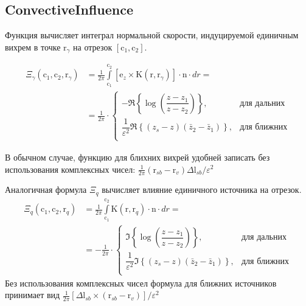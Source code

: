 \documentclass[a4paper,14pt]{extreport}
\newcommand{\br}[1]{\boldsymbol{\mathrm{#1}}}
\renewcommand{\vec}[1]{\br{#1}}
\begin{document}
\subsection{ConvectiveInfluence}
\label{ConvectiveInfluence}
Функция вычисляет интеграл нормальной скорости, индуцируемой единичным вихрем 
в точке $\vec r_\gamma$ на отрезок $[\vec c_1, \vec c_2]$.

\begin{equation}
\label{eq_VortexInfluence}
\begin{split}
\Xi_\gamma(\vec c_1, \vec c_2, \vec r_\gamma)
&= \frac{1}{2\pi} \int\limits_{\vec c_1}^{\vec c_2} [\vec e_z \times \vec K(\vec r,\vec r_\gamma)] \cdot \vec n \cdot dr
= \\ &= \frac{1}{2\pi} \cdot
\begin{cases}
-\Re \left\lbrace \log \left(\dfrac{z-z_1}{z-z_2}\right) \right\rbrace,	&\text{для дальних}\\
\dfrac{1}{\varepsilon^2}\Re \left\lbrace (z_s-z)(\bar z_2 - \bar z_1) \right\rbrace, 	&\text{для ближних}\\
\end{cases}
\end{split}
\end{equation}
\begin{center}\end{center}

В обычном случае, функцию для блихних вихрей удобней записать без использования
комплексных чисел:
$\frac{1}{2\pi} (\vec r_{sb} - \vec r_v) \Delta\vec l_{sb} / \varepsilon^2$

Аналогичная формула $\Xi_q$ вычисляет влияние единичного источника на отрезок.
\begin{equation}
\label{eq_SourceInfluence}
\begin{split}
\Xi_q (\vec c_1, \vec c_2, \vec r_q)
&= \frac{1}{2\pi} \int\limits_{\vec c_1}^{\vec c_2} \vec K(\vec r, \vec r_q) \cdot \vec n \cdot dr
= \\ & = -\frac{1}{2\pi} \cdot
\begin{cases}
\Im \left\lbrace \log \left(\dfrac{z-z_1}{z-z_2}\right) \right\rbrace,	&\text{для дальних}\\
\dfrac{1}{\varepsilon^2}\Im \left\lbrace (z_s-z)(\bar z_2 - \bar z_1) \right\rbrace, 	&\text{для ближних}\\
\end{cases}
\end{split}
\end{equation}
Без использования комплексных чисел формула для ближних источников принимает вид
$\frac{1}{2\pi} [\Delta \vec l_{sb} \times (\vec r_{sb} - \vec r_v)]/\varepsilon^2$
\end{document}
